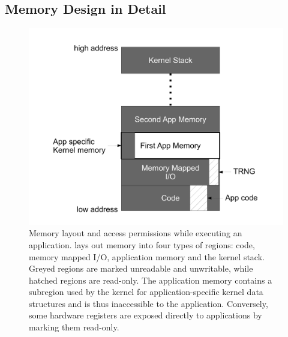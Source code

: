 %


\subsection{\name Memory Design in Detail}


\begin{figure}
 \centering
\includegraphics[width=1\columnwidth]{img/memory-layout}
\caption{Memory layout and access permissions while executing an application.
\name lays out memory into four types of regions: code, memory mapped I/O,
application memory and the kernel stack. Greyed regions are marked unreadable
and unwritable, while hatched regions are read-only. The application memory
contains a subregion used by the kernel for application-specific kernel data
structures and is thus inaccessible to the application. Conversely, some
hardware registers are exposed directly to applications by marking them
read-only.}
 \label{fig:memory-layout}
\end{figure}

